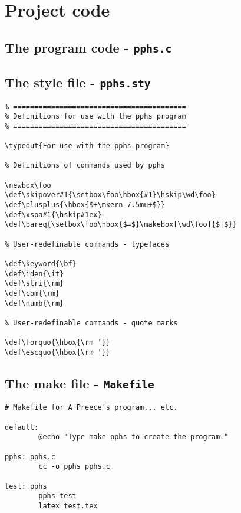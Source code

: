 \chapter{Project code}

\section{The program code - {\tt pphs.c}} \label{prog-code}

\newpage		    %
\setcounter{page}{50}

\section{The style file - {\tt pphs.sty}} \label{style-code}

\begin{verbatim}
% =========================================
% Definitions for use with the pphs program
% =========================================

\typeout{For use with the pphs program}

% Definitions of commands used by pphs

\newbox\foo
\def\skipover#1{\setbox\foo\hbox{#1}\hskip\wd\foo}
\def\plusplus{\hbox{$+\mkern-7.5mu+$}}
\def\xspa#1{\hskip#1ex}
\def\bareq{\setbox\foo\hbox{$=$}\makebox[\wd\foo]{$|$}}

% User-redefinable commands - typefaces

\def\keyword{\bf}
\def\iden{\it}
\def\stri{\rm}
\def\com{\rm}
\def\numb{\rm}

% User-redefinable commands - quote marks

\def\forquo{\hbox{\rm '}}
\def\escquo{\hbox{\rm '}}
\end{verbatim}

\section{The make file - {\tt Makefile}} \label{make-code}

\begin{verbatim}
# Makefile for A Preece's program... etc.

default:
        @echo "Type make pphs to create the program."

pphs: pphs.c
        cc -o pphs pphs.c

test: pphs
        pphs test
        latex test.tex
\end{verbatim}